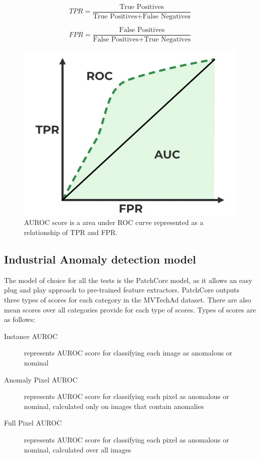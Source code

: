 \begin{equation}
	TPR = \frac{\text{True Positives}}{\text{True Positives} + \text{False Negatives}}
	\label{eq:tpr}
\end{equation}

\begin{equation}
	FPR = \frac{\text{False Positives}}{\text{False Positives} + \text{True Negatives}}
	\label{eq:fpr}
\end{equation}

\begin{figure}[t]
	\begin{center}
		\includegraphics[width=0.5\linewidth]{Chapter_4/auroc.png}
	\end{center}
	\caption{AUROC score is a area under ROC curve represented as a relationship of TPR and FPR.\cite{auroc}}
	\label{fig:auroc}
\end{figure}

\subsection{Industrial Anomaly detection model}
The model of choice for all the tests is the PatchCore model, as it allows an easy plug and play approach to pre-trained feature extractors. PatchCore outputs three types of scores for each category in the MVTechAd\cite{mvtecad} dataset. There are also mean scores over all categories provide for each type of scores. Types of scores are as follows:

\begin{description}
  \item[Instance AUROC] represents AUROC score for classifying each image as anomalous or nominal \cite{patchcore}
  \item[Anomaly Pixel AUROC] represents AUROC score for classifying each pixel as anomalous or nominal, calculated only on images that contain anomalies \cite{patchcore}
  \item[Full Pixel AUROC] represents AUROC score for classifying each pixel as anomalous or nominal, calculated over all images \cite{patchcore}
\end{description}

